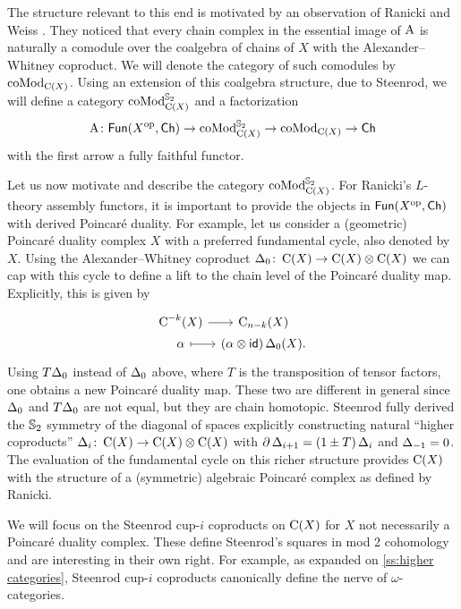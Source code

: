 The structure relevant to this end is motivated by an observation of Ranicki and Weiss \cite{ranicki1990assembly}.
They noticed that every chain complex in the essential image of $\operatorname{A}$ is naturally a comodule over the coalgebra of chains of $X$ with the Alexander--Whitney coproduct.
We will denote the category of such comodules by $\operatorname{coMod}_{\operatorname{C}(X)}$.
Using an extension of this coalgebra structure, due to Steenrod, we will define a category $\operatorname{coMod}^{\mathbb{S}_2}_{\operatorname{C}(X)}$ and a factorization
\[
\operatorname{A} \colon \mathsf{Fun}(X^{\mathrm{op}}, \mathsf{Ch}) \to \operatorname{coMod}^{\mathbb{S}_2}_{\operatorname{C}(X)} \to \operatorname{coMod}_{\operatorname{C}(X)} \to \mathsf{Ch}
\]
with the first arrow a fully faithful functor.

Let us now motivate and describe the category $\operatorname{coMod}^{\mathbb{S}_2}_{\operatorname{C}(X)}$.
For Ranicki's $L$-theory assembly functors, it is important to provide the objects in $\mathsf{Fun}(X^{\mathrm{op}}, \mathsf{Ch})$ with derived Poincar\'e duality.
For example, let us consider a (geometric) Poincar\'e duality complex $X$ with a preferred fundamental cycle, also denoted by $X$.
Using the Alexander--Whitney coproduct $\operatorname{\Delta}_0 \colon \operatorname{C}(X) \to \operatorname{C}(X) \otimes \operatorname{C}(X)$ we can cap with this cycle to define a lift to the chain level of the Poincar\'e duality map.
Explicitly, this is given by
\[
\begin{tikzcd}[column sep=tiny,row sep=0]
	\cochains^{-k}(X) \arrow[r] & \chains_{n-k}(X) \\
	\alpha \arrow[r,mapsto] & (\alpha \ot \id)\copr_0(X).
\end{tikzcd}
\]
Using $T\!\operatorname{\Delta}_0$ instead of $\operatorname{\Delta}_0$ above, where $T$ is the transposition of tensor factors, one obtains a new Poincar\'e duality map.
These two are different in general since $\operatorname{\Delta}_0$ and $T\!\operatorname{\Delta}_0$ are not equal, but they are chain homotopic.
Steenrod \cite{steenrod1947products} fully derived the $\mathbb{S}_2$ symmetry of the diagonal of spaces explicitly constructing natural ``higher coproducts'' $\operatorname{\Delta}_i \colon \operatorname{C}(X) \to \operatorname{C}(X) \otimes \operatorname{C}(X)$ with $\operatorname{\partial} \operatorname{\Delta}_{i+1} = (1 \pm T) \operatorname{\Delta}_i$ and $\operatorname{\Delta}_{-1} = 0$.
The evaluation of the fundamental cycle on this richer structure provides $\operatorname{C}(X)$ with the structure of a (symmetric) algebraic Poincar\'e complex as defined by Ranicki.

We will focus on the Steenrod cup-$i$ coproducts on $\operatorname{C}(X)$ for $X$ not necessarily a Poincar\'e duality complex.
These define Steenrod's squares in mod 2 cohomology and are interesting in their own right.
For example, as expanded on \cref{ss:higher categories}, Steenrod cup-$i$ coproducts canonically define the nerve of $\omega$-categories.

